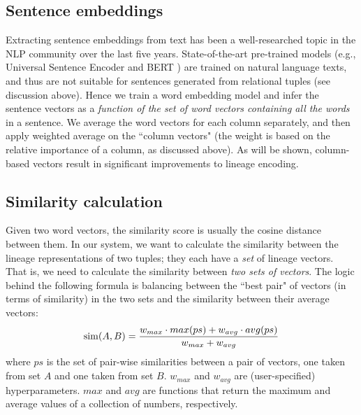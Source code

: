 \subsection{Sentence embeddings} Extracting sentence embeddings from text has been a well-researched topic in the NLP community over the last five years. State-of-the-art pre-trained models (e.g., Universal Sentence Encoder \cite{Cer2018UniversalSE, use_github} and BERT \cite{devlin2018bert}) are trained on natural language texts, and thus are not suitable for sentences generated from relational tuples (see discussion above). Hence we train a word embedding model and infer the sentence vectors as a \textit{function of the set of word vectors containing all the words} in a sentence. We average the word vectors for each column separately, and then apply weighted average on the ``column vectors" (the weight is based on the relative importance of a column, as discussed above). As will be shown, column-based vectors result in significant improvements to lineage encoding.
\subsection{Similarity calculation} Given two word vectors, the similarity score is usually the cosine distance between them. In our system, we want to calculate the similarity between the lineage representations of two tuples; they each have a \textit{set} of lineage vectors. That is, we need to calculate the similarity between \textit{two sets of vectors}\footnotemark. The logic behind the following formula is balancing between the ``best pair" of vectors (in terms of similarity) in the two sets and the similarity between their average vectors:\\
\begin{equation*}
    \operatorname{sim}(A, B) = \frac{w_{max} \cdot max(ps) + w_{avg} \cdot avg(ps)}
    {w_{max} + w_{avg}}\\
\end{equation*}
where $ps$ is the set of pair-wise similarities between a pair of vectors, one taken from set $A$ and one taken from set $B$. $w_{max}$ and $w_{avg}$ are (user-specified) hyperparameters. $max$ and $avg$ are functions that return the maximum and average values of a collection of numbers, respectively\footnotemark.


